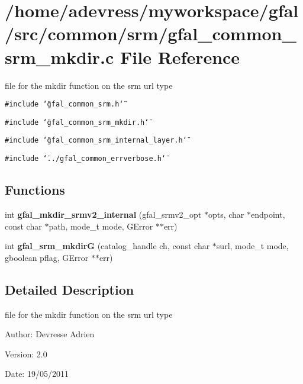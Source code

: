 \section{/home/adevress/myworkspace/gfal/src/common/srm/gfal\_\-common\_\-srm\_\-mkdir.c File Reference}
\label{gfal__common__srm__mkdir_8c}
file for the mkdir function on the srm url type 

{\tt \#include \char`\"{}gfal\_\-common\_\-srm.h\char`\"{}}\par
{\tt \#include \char`\"{}gfal\_\-common\_\-srm\_\-mkdir.h\char`\"{}}\par
{\tt \#include \char`\"{}gfal\_\-common\_\-srm\_\-internal\_\-layer.h\char`\"{}}\par
{\tt \#include \char`\"{}../gfal\_\-common\_\-errverbose.h\char`\"{}}\par
\subsection*{Functions}
\begin{CompactItemize}
\item 
int \textbf{gfal\_\-mkdir\_\-srmv2\_\-internal} (gfal\_\-srmv2\_\-opt $\ast$opts, char $\ast$endpoint, const char $\ast$path, mode\_\-t mode, GError $\ast$$\ast$err)\label{gfal__common__srm__mkdir_8c_00ce847803c5ae9d125fd974c9d66e03}

\item 
int \textbf{gfal\_\-srm\_\-mkdir\-G} (catalog\_\-handle ch, const char $\ast$surl, mode\_\-t mode, gboolean pflag, GError $\ast$$\ast$err)\label{gfal__common__srm__mkdir_8c_93289fd14057ff871e9dd489722f1a76}

\end{CompactItemize}


\subsection{Detailed Description}
file for the mkdir function on the srm url type 

\begin{Desc}
\item[Author:]Devresse Adrien \end{Desc}
\begin{Desc}
\item[Version:]2.0 \end{Desc}
\begin{Desc}
\item[Date:]19/05/2011 \end{Desc}
